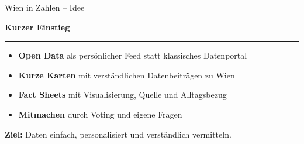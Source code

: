 \begin{frame}{Wien in Zahlen -- Idee}
  \centering

  {\large\bfseries Kurzer Einstieg}\\[-0.2em]
  \rule{0.55\textwidth}{0.4pt}

  \vspace{0.7cm}

  \begin{minipage}{0.78\textwidth}
    \begin{itemize}
      \setlength\itemsep{0.8em}

      \item \textbf{Open Data} als persönlicher Feed statt klassisches Datenportal

      \item \textbf{Kurze Karten} mit verständlichen Datenbeiträgen zu Wien

      \item \textbf{Fact Sheets} mit Visualisierung, Quelle und Alltagsbezug

      \item \textbf{Mitmachen} durch Voting und eigene Fragen

    \end{itemize}
  \end{minipage}

  \vspace{0.6cm}

  {\small
    \textbf{Ziel:} Daten einfach, personalisiert und verständlich vermitteln.
  }

\end{frame}


